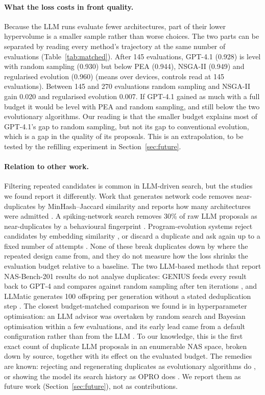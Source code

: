 \documentclass[11pt,a4paper]{article}
\begin{document}
\paragraph{What the loss costs in front quality.} Because the LLM runs evaluate fewer architectures, part of their lower hypervolume is a smaller sample rather than worse choices. The two parts can be separated by reading every method's trajectory at the same number of evaluations (Table~\ref{tab:matched}). After 145 evaluations, GPT-4.1 (0.928) is level with random sampling (0.930) but below PEA (0.944), NSGA-II (0.949) and regularised evolution (0.960) (means over devices, controls read at 145 evaluations). Between 145 and 270 evaluations random sampling and NSGA-II gain 0.020 and regularised evolution 0.007. If GPT-4.1 gained as much with a full budget it would be level with PEA and random sampling, and still below the two evolutionary algorithms. Our reading is that the smaller budget explains most of GPT-4.1's gap to random sampling, but not its gap to conventional evolution, which is a gap in the quality of its proposals. This is an extrapolation, to be tested by the refilling experiment in Section~\ref{sec:future}.

\paragraph{Relation to other work.} Filtering repeated candidates is common in LLM-driven search, but the studies we found report it differently. Work that generates network code removes near-duplicates by MinHash--Jaccard similarity and reports how many architectures were admitted \cite{khalid26,adhikari26}. A spiking-network search removes 30\% of raw LLM proposals as near-duplicates by a behavioural fingerprint \cite{zhao26spiking}. Program-evolution systems reject candidates by embedding similarity \cite{shinka}, or discard a duplicate and ask again up to a fixed number of attempts \cite{lyria}. None of these break duplicates down by where the repeated design came from, and they do not measure how the loss shrinks the evaluation budget relative to a baseline. The two LLM-based methods that report NAS-Bench-201 results do not analyse duplicates: GENIUS feeds every result back to GPT-4 and compares against random sampling after ten iterations \cite{genius}, and LLMatic generates 100 offspring per generation without a stated deduplication step \cite{llmatic}. The closest budget-matched comparison we found is in hyperparameter optimisation: an LLM advisor was overtaken by random search and Bayesian optimisation within a few evaluations, and its early lead came from a default configuration rather than from the LLM \cite{rodrigues26}. To our knowledge, this is the first exact count of duplicate LLM proposals in an enumerable NAS space, broken down by source, together with its effect on the evaluated budget. The remedies are known: rejecting and regenerating duplicates as evolutionary algorithms do \cite{mauldin84,lyria}, or showing the model its search history as OPRO does \cite{opro}. We report them as future work (Section~\ref{sec:future}), not as contributions.
\end{document}

